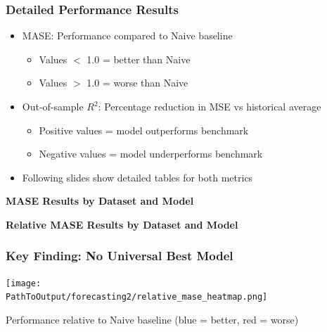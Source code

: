 \documentclass[ignorenonframetext, 9pt]{beamer}
\begin{document}
\begin{frame}
    \frametitle{Detailed Performance Results}
    \begin{itemize}
    \item MASE: Performance compared to Naive baseline
    \begin{itemize}
      \item Values $<$ 1.0 = better than Naive
      \item Values $>$ 1.0 = worse than Naive
    \end{itemize}
    \item Out-of-sample $R^2$: Percentage reduction in MSE vs historical average
    \begin{itemize}
      \item Positive values = model outperforms benchmark
      \item Negative values = model underperforms benchmark
    \end{itemize}
    \item Following slides show detailed tables for both metrics
    \end{itemize}
  \end{frame}
  
\begin{frame}[plain]
    \tiny
    \vspace{-0.5cm}
    \centering
    \textbf{MASE Results by Dataset and Model}\\
    \vspace{0.2cm}
    
  \end{frame}
  
  \begin{frame}[plain]
    \tiny
    \vspace{-0.5cm}
    \centering
    \textbf{Relative MASE Results by Dataset and Model}\\
    \vspace{0.2cm}
    
  \end{frame}

\begin{frame}
  \frametitle{Key Finding: No Universal Best Model}
  \centering
  \texttt{[image: \\PathToOutput/forecasting2/relative\_mase\_heatmap.png]}
  \vspace{0.2cm}

  Performance relative to Naive baseline (blue = better, red = worse)
\end{frame}
\end{document}
